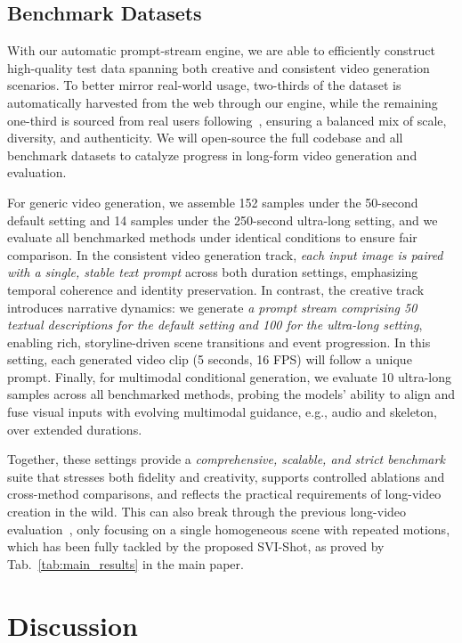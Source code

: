 \documentclass{article} %
\begin{document}
\subsection{Benchmark Datasets}

With our automatic prompt-stream engine, we are able to efficiently construct high-quality test data spanning both creative and consistent video generation scenarios. To better mirror real-world usage, two-thirds of the dataset is automatically harvested from the web through our engine, while the remaining one-third is sourced from real users following~\citep{zhang2025packing}, ensuring a balanced mix of scale, diversity, and authenticity. We will open-source the full codebase and all benchmark datasets to catalyze progress in long-form video generation and evaluation.

For generic video generation, we assemble 152 samples under the 50-second default setting and 14 samples under the 250-second ultra-long setting, and we evaluate all benchmarked methods under identical conditions to ensure fair comparison. In the consistent video generation track, \emph{each input image is paired with a single, stable text prompt} across both duration settings, emphasizing temporal coherence and identity preservation. In contrast, the creative track introduces narrative dynamics: we generate \emph{a prompt stream comprising 50 textual descriptions for the default setting and 100 for the ultra-long setting}, enabling rich, storyline-driven scene transitions and event progression. In this setting, each generated video clip (5 seconds, 16 FPS) will follow a unique prompt. Finally, for multimodal conditional generation, we evaluate 10 ultra-long samples across all benchmarked methods, probing the models’ ability to align and fuse visual inputs with evolving multimodal guidance, e.g., audio and skeleton, over extended durations.

Together, these settings provide a \emph{comprehensive, scalable, and strict benchmark} suite that stresses both fidelity and creativity, supports controlled ablations and cross-method comparisons, and reflects the practical requirements of long-video creation in the wild. This can also break through the previous long-video evaluation~\citep{zhang2025packing,henschel2025streamingt2v,songhistory}, only focusing on a single homogeneous scene with repeated motions, which has been fully tackled by the proposed SVI-Shot, as proved by Tab.~\ref{tab:main_results} in the main paper.


\section{Discussion}
\end{document}
